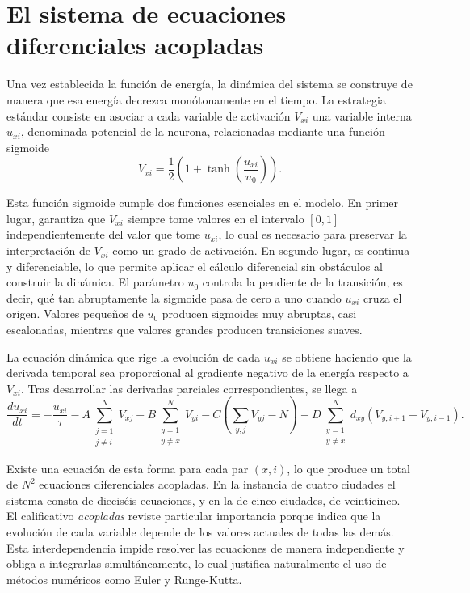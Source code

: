 \documentclass[12pt,a4paper]{article}
\begin{document}
\section{El sistema de ecuaciones diferenciales acopladas}

Una vez establecida la función de energía, la dinámica del sistema se construye de manera que esa energía decrezca monótonamente en el tiempo. La estrategia estándar consiste en asociar a cada variable de activación $V_{xi}$ una variable interna $u_{xi}$, denominada potencial de la neurona, relacionadas mediante una función sigmoide
\begin{equation}
\label{eq:sigmoide}
V_{xi} = \frac{1}{2}\left( 1 + \tanh\!\left( \frac{u_{xi}}{u_0} \right) \right).
\end{equation}

Esta función sigmoide cumple dos funciones esenciales en el modelo. En primer lugar, garantiza que $V_{xi}$ siempre tome valores en el intervalo $[0, 1]$ independientemente del valor que tome $u_{xi}$, lo cual es necesario para preservar la interpretación de $V_{xi}$ como un grado de activación. En segundo lugar, es continua y diferenciable, lo que permite aplicar el cálculo diferencial sin obstáculos al construir la dinámica. El parámetro $u_0$ controla la pendiente de la transición, es decir, qué tan abruptamente la sigmoide pasa de cero a uno cuando $u_{xi}$ cruza el origen. Valores pequeños de $u_0$ producen sigmoides muy abruptas, casi escalonadas, mientras que valores grandes producen transiciones suaves.

La ecuación dinámica que rige la evolución de cada $u_{xi}$ se obtiene haciendo que la derivada temporal sea proporcional al gradiente negativo de la energía respecto a $V_{xi}$. Tras desarrollar las derivadas parciales correspondientes, se llega a
\begin{equation}
\label{eq:edo}
\frac{du_{xi}}{dt} = -\frac{u_{xi}}{\tau} - A\!\sum_{\substack{j=1 \\ j \neq i}}^{N}\! V_{xj} - B\!\sum_{\substack{y=1 \\ y \neq x}}^{N}\! V_{yi} - C\!\left( \sum_{y,j} V_{yj} - N \right) - D\!\sum_{\substack{y=1 \\ y \neq x}}^{N}\! d_{xy}\!\left( V_{y,i+1} + V_{y,i-1} \right).
\end{equation}

Existe una ecuación de esta forma para cada par $(x, i)$, lo que produce un total de $N^2$ ecuaciones diferenciales acopladas. En la instancia de cuatro ciudades el sistema consta de dieciséis ecuaciones, y en la de cinco ciudades, de veinticinco. El calificativo \emph{acopladas} reviste particular importancia porque indica que la evolución de cada variable depende de los valores actuales de todas las demás. Esta interdependencia impide resolver las ecuaciones de manera independiente y obliga a integrarlas simultáneamente, lo cual justifica naturalmente el uso de métodos numéricos como Euler y Runge-Kutta.
\end{document}
